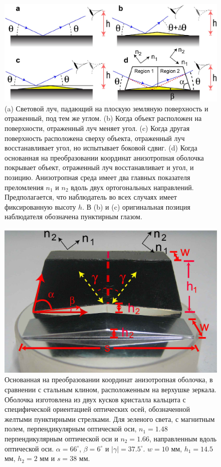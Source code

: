 \documentclass[a4paper, 12pt]{article}
\begin{document}
\begin{figure}
\begin{centering}
\includegraphics[width=0.7\columnwidth,draft=false]{Fig_1}
\caption{\label{fig:rays}  (a) Световой луч, падающий на плоскую земляную
поверхность и отраженный, под тем же углом.
(b) Когда объект расположен на поверхности, отраженный луч меняет угол. 
(c) Когда другая поверхность расположена сверху объекта, отраженный луч 
восстанавливает угол, но испытывает боковой сдвиг. (d) Когда основанная на 
преобразовании координат анизотропная оболочка покрывает объект, отраженный луч
восстанавливает и угол, и позицию. Анизотропная среда имеет два главных
показателя преломления $n_1$ и $n_2$ вдоль двух ортогональных направлений. 
Предполагается, что наблюдатель во всех случаях имеет фиксированную высоту $h$.
В (b) и (c) оригинальная позиция наблюдателя обозначена пунктирным глазом.}
\end{centering}
\end{figure}

\begin{figure}
\begin{centering}
\includegraphics[width=0.7\columnwidth,draft=false]{Fig_2}
\caption{\label{fig:setup} Основанная на преобразовании координат
анизотропная оболочка, в сравнении с стальным клином, расположенным
на верхушке зеркала. Оболочка изготовлена из двух кусков кристалла кальцита
с специфической ориентацией оптических осей, обозначенной желтыми пунктирными
стрелками. Для зеленого света, с магнитным полем, перпендикулярным оптической 
оси, $n_1 = 1.48$ перпендикулярным оптической оси и $n_2 = 1.66$, направленным
вдоль оптической оси. $\alpha=66^{\circ}$, $\beta = 6^{\circ}$ и 
$\left|\gamma\right| = 37.5^{\circ}$. $w=10$ мм, $h_1 = 14.5$ мм, 
$h_2 = 2$ мм и $s=38$ мм.}
\end{centering}
\end{figure}
\end{document}
